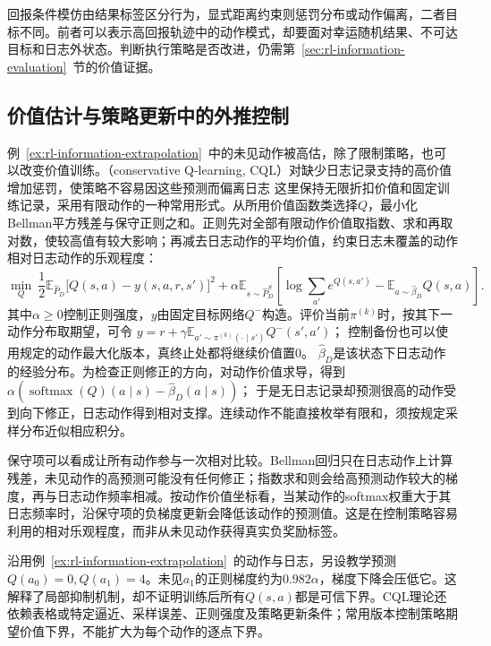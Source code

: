 回报条件模仿由结果标签区分行为，显式距离约束则惩罚分布或动作偏离，二者目标不同。前者可以表示高回报轨迹中的动作模式，却要面对幸运随机结果、不可达目标和日志外状态。判断执行策略是否改进，仍需第~\ref{sec:rl-information-evaluation}~节的价值证据。

\subsection{价值估计与策略更新中的外推控制}
\label{sec:rl-information-pessimism}

例~\ref{ex:rl-information-extrapolation}~中的未见动作被高估，除了限制策略，也可以改变价值训练。（conservative Q-learning, CQL）对缺少日志记录支持的高价值增加惩罚，使策略不容易因这些预测而偏离日志
这里保持无限折扣价值和固定训练记录，采用有限动作的一种常用形式。从所用价值函数类选择$Q$，最小化Bellman平方残差与保守正则之和。正则先对全部有限动作价值取指数、求和再取对数，使较高值有较大影响；再减去日志动作的平均价值，约束日志未覆盖的动作相对日志动作的乐观程度：
\begin{equation}
  \label{eq:rl-information-cql}
  \min_Q\
  \frac12\mathbb E_{\widehat P_D}\bigl[Q(s,a)-y(s,a,r,s')\bigr]^2
  +\alpha\mathbb E_{s\sim\widehat P_D^S}
       \left[\log\sum_{a'}e^{Q(s,a')}
                       -\mathbb E_{a\sim\widehat\beta_{D}}Q(s,a)\right].
\end{equation}
其中$\alpha\geq0$控制正则强度，$y$由固定目标网络$Q^-$构造。评价当前$\pi^{(k)}$时，按其下一动作分布取期望，可令
$y=r+\gamma\mathbb E_{a'\sim\pi^{(k)}(\cdot\mid s')}Q^-(s',a')$；
控制备份也可以使用规定的动作最大化版本，真终止处都将继续价值置0。
$\widehat\beta_{D}$是该状态下日志动作的经验分布。为检查正则修正的方向，对动作价值求导，得到
$\alpha(\operatorname{softmax}(Q)(a\mid s)-\widehat\beta_{D}(a\mid s))$；
于是无日志记录却预测很高的动作受到向下修正，日志动作得到相对支撑。连续动作不能直接枚举有限和，须按规定采样分布近似相应积分。

保守项可以看成让所有动作参与一次相对比较。Bellman回归只在日志动作上计算残差，未见动作的高预测可能没有任何修正；指数求和则会给高预测动作较大的梯度，再与日志动作频率相减。按动作价值坐标看，当某动作的softmax权重大于其日志频率时，沿保守项的负梯度更新会降低该动作的预测值。这是在控制策略容易利用的相对乐观程度，而非从未见动作获得真实负奖励标签。

沿用例~\ref{ex:rl-information-extrapolation}~的动作与日志，另设教学预测
$Q(a_0)=0,Q(a_1)=4$。未见$a_1$的正则梯度约为$0.982\alpha$，梯度下降会压低它。这解释了局部抑制机制，却不证明训练后所有$Q(s,a)$都是可信下界。CQL理论还依赖表格或特定逼近、采样误差、正则强度及策略更新条件；常用版本控制策略期望价值下界，不能扩大为每个动作的逐点下界。


